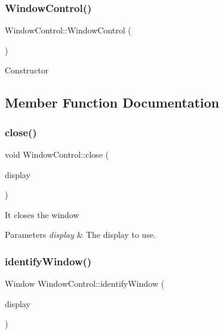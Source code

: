 \subsubsection{\texorpdfstring{Window\+Control()}{WindowControl()}}
{\footnotesize\ttfamily Window\+Control\+::\+Window\+Control (\begin{DoxyParamCaption}\item[{void}]{ }\end{DoxyParamCaption})}

Constructor 

\subsection{Member Function Documentation}
\mbox{\label{classUbuntuController_1_1WindowControl_a2f521062be8be113d1cbcca4f495d693}} 
\subsubsection{\texorpdfstring{close()}{close()}}
{\footnotesize\ttfamily void Window\+Control\+::close (\begin{DoxyParamCaption}\item[{Display $\ast$}]{display }\end{DoxyParamCaption})}

It closes the window


\begin{DoxyParams}{Parameters}
{\em display} & The display to use. \\
\hline
\end{DoxyParams}
\mbox{\label{classUbuntuController_1_1WindowControl_aad092a22b19664df4d94fe9a853d350a}} 
\subsubsection{\texorpdfstring{identify\+Window()}{identifyWindow()}}
{\footnotesize\ttfamily Window Window\+Control\+::identify\+Window (\begin{DoxyParamCaption}\item[{Display $\ast$}]{display }\end{DoxyParamCaption})}

